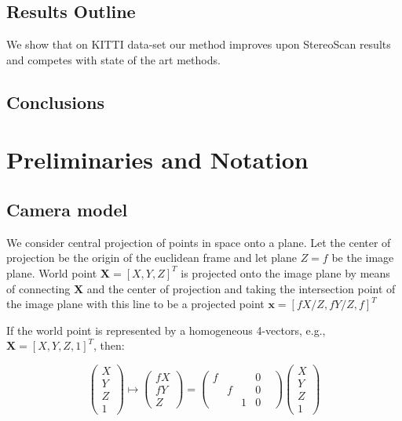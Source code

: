 \documentclass[runningheads]{llncs}
\begin{document}
\subsection{Results Outline}

We show that on KITTI data-set our method improves upon StereoScan
results and competes with state of the art methods.

\subsection{Conclusions}

\section{Preliminaries and Notation}

\subsection{Camera model}

We consider central projection of points in space onto a plane. Let
the center of projection be the origin of the euclidean frame and let
plane $Z=f$ be the image plane. World point $\mathbf{X}=[X,Y,Z]^T$ is
projected onto the image plane by means of connecting $\mathbf{X}$ and
the center of projection and taking the intersection point of the
image plane with this line to be a projected point
$\mathbf{x}=[fX/Z,fY/Z,f]^T$


If the world point is represented by a homogeneous 4-vectors, e.g.,
$\mathbf{X} = [X,Y,Z,1]^T$, then:

\begin{equation}\label{eq:central_projection}
\begin{pmatrix}
X\\ Y\\ Z\\ 1
\end{pmatrix}
\mapsto
\begin{pmatrix}
fX\\ fY\\ Z
\end{pmatrix}
=
\begin{pmatrix}
f& & &0& \\
 &f& &0& \\
 & &1&0&
\end{pmatrix}
\begin{pmatrix}
X\\ Y\\ Z\\ 1
\end{pmatrix}
\end{equation}
\end{document}
